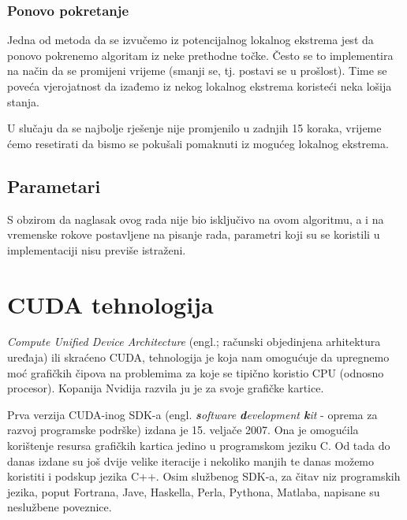 \documentclass[times, utf8, zavrsni]{fer}
\begin{document}
\subsection{Ponovo pokretanje}

Jedna od metoda da se izvučemo iz potencijalnog lokalnog ekstrema jest da
ponovo pokrenemo algoritam iz neke prethodne točke. Često se to implementira
na način da se promijeni vrijeme (smanji se, tj. postavi se u prošlost).
Time se poveća vjerojatnost da izađemo iz nekog lokalnog ekstrema koristeći
neka lošija stanja. 

U slučaju da se najbolje rješenje nije promjenilo u zadnjih 15 koraka, 
vrijeme ćemo resetirati da bismo se pokušali pomaknuti iz mogućeg lokalnog
ekstrema. 

\section{Parametari}

S obzirom da naglasak ovog rada nije bio isključivo na ovom algoritmu, 
a i na vremenske rokove postavljene na pisanje rada, parametri koji su se
koristili u implementaciji nisu previše istraženi. 






\chapter{CUDA tehnologija}
\textit{Compute Unified Device Architecture} (engl.; računski objedinjena
arhitektura uređaja) ili skraćeno CUDA, tehnologija je
koja nam omogućuje da upregnemo moć grafičkih čipova na
problemima za koje se tipično koristio CPU (odnosno procesor).
Kopanija Nvidija razvila ju je za svoje grafičke kartice. 

Prva verzija CUDA-inog SDK-a (engl. \textit{\textbf{s}oftware
\textbf{d}evelopment \textbf{k}it} - oprema za razvoj programske
podrške) izdana je 15. veljače 2007.
Ona je omogućila korištenje resursa grafičkih kartica jedino u
programskom jeziku C. Od tada do danas izdane su još dvije velike
iteracije i nekoliko manjih te danas možemo koristiti i podskup
jezika C++. Osim službenog SDK-a, za čitav niz programskih jezika,
poput Fortrana, Jave, Haskella, Perla, Pythona, Matlaba, napisane su
neslužbene poveznice. 
\end{document}
